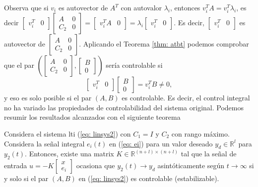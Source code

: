 Observa que si $v_i$ es autovector de $A^T$ con autovalor $\lambda_i$, entonces $v_i^T A = v_i^T\lambda_i$, es decir $\begin{bmatrix}v_i^T & 0\end{bmatrix} \begin{bmatrix}A & 0 \\ C_2 & 0\end{bmatrix} = \begin{bmatrix}v_i^TA & 0\end{bmatrix} = \lambda_i\begin{bmatrix}v_i^T & 0\end{bmatrix}$. Es decir, $\begin{bmatrix}v_i^T & 0\end{bmatrix}$ es autovector de $\begin{bmatrix}A & 0 \\ C_2 & 0\end{bmatrix}$. Aplicando el Teorema \ref{thm: atbt} podemos comprobar que el par $\left(\begin{bmatrix}A & 0 \\ C_2 & 0\end{bmatrix}, \begin{bmatrix}B \\ 0 \end{bmatrix}\right)$ sería controlable si
	\begin{equation}
		\begin{bmatrix}v_i^T & 0\end{bmatrix} \begin{bmatrix}B \\ 0 \end{bmatrix} = v_i^TB \neq 0,
	\end{equation} y eso es solo posible si el par $(A,B)$ es controlable. Es decir, el control integral no ha variado las propiedades de controlabilidad del sistema original. Podemos resumir los resultados alcanzados con el siguiente teorema
\begin{theorem}
	Considera el sistema lti (\ref{eq: linsys2}) con $C_1 = I$ y $C_2$ con rango máximo. Considera la señal integral $e_i(t)$ en (\ref{eq: ei}) para un valor deseado $y_d\in\mathbb{R}^l$ para $y_2(t)$. Entonces, existe una matrix $K \in\mathbb{R}^{(n+l)\times(n+l)}$ tal que la señal de entrada $u = -K \begin{bmatrix}x \\ e_i\end{bmatrix}$ ocasiona que $y_2(t) \to y_d$ asintóticamente según $t\to\infty$ si y solo si el par $(A,B)$ en (\ref{eq: linsys2}) es controlable (estabilizable).
\end{theorem}
